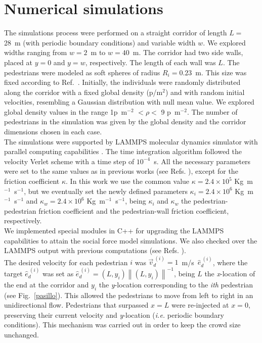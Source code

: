 \section{\label{simulations}Numerical simulations}

The simulations process were performed on a straight corridor of length $L=$ 28~m (with periodic boundary conditions) and variable width $w$. We explored widths ranging from $w=2$~m to $w=40$~m. The corridor had two side walls, placed at $y=0$ and $y=w$, respectively. The length of each wall was $L$. The pedestrians were modeled as soft spheres of radius $R_i=0.23$~m. This size was fixed according to Ref.~\cite{metric_handbook}. Initially, the individuals were randomly distributed along the corridor with a fixed global density (p/m$^{2}$) and with random initial velocities, resembling a Gaussian distribution with null mean value. We explored global density values in the range 1p~m$^{-2}$ $<\rho<$ 9 p~m$^{-2}$. The number of pedestrians in the simulation was given by the global density and the corridor dimensions chosen in each case. \\

The simulations were supported by LAMMPS molecular dynamics simulator with parallel computing capabilities \cite{plimpton}.
The time integration algorithm followed the velocity Verlet scheme with a time step of $10^{-4}$~s. All the necessary parameters
were set to the same values as in previous works (see Refs. \cite{sticco,Dorso5}), except for the friction coefficient $\kappa$. In this work we use the common value $\kappa=2.4 \times 10^{5}$ Kg~m$^{-1}$~s$^{-1}$, but we eventually set the newly defined parameters $\kappa_i=2.4 \times 10^{6}$ Kg~m$^{-1}$~s$^{-1}$  and $\kappa_w=2.4 \times 10^{6}$ Kg~m$^{-1}$~s$^{-1}$, being $\kappa_i$ and $\kappa_w$ the pedestrian-pedestrian friction coefficient and the pedestrian-wall friction coefficient, respectively. \\

We implemented special modules in C++ for upgrading the LAMMPS capabilities to attain the social force model simulations. We also checked over the LAMMPS output with previous computations (see Refs. \cite{Dorso1, Dorso2,Dorso3, Dorso4,Dorso6}).\\

The desired velocity for each pedestrian $i$ was $\vec{v}_d^{~(i)}=1$~m/s~$\hat{e}_d^{~(i)}$, where the target $\hat{e}_d^{~(i)}$ was set as $\hat{e}_d^{~(i)}=(L,y_i)\left \| (L,y_i) \right \|^{-1}$, being $L$ the \textit{x}-location of the end at the corridor and $y_i$ the \textit{y}-location corresponding to the \textit{ith} pedestrian (see Fig.~\ref{pasillo}). This allowed the pedestrians to move from left to right in an unidirectional flow. Pedestrians that surpassed $x=L$ were re-injected at $x=0$, preserving their current velocity and \textit{y}-location (\textit{i.e.} periodic boundary conditions). This mechanism was carried out in order to keep
the crowd size unchanged.\\

